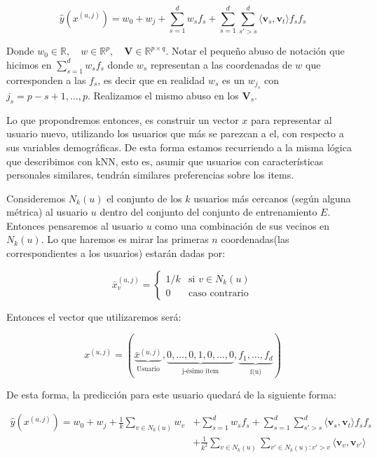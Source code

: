 \documentclass[hidelinks,12pt,a4paper]{book}
\providecommand{\prodint}[1]{\langle#1\rangle}
\theoremstyle{plain}
\theoremstyle{definition}
\begin{document}
\begin{equation}
\label{eq:prop0}
\hat{y}(x^{(u,j)}) = w_0+ w_j + \sum_{s = 1}^d w_s f_s + \sum_{s=1}^d \sum_{s'>s}^d \prodint{\mathbf{v}_s,\mathbf{v}_t} f_s f_{s}
\end{equation}

Donde  $w_0 \in \mathbb{R}, \quad w \in \mathbb{R}^p, \quad \textbf{V} \in \mathbb{R}^{p \times {q}}$. Notar el pequeño abuso de notación que hicimos en $\sum_{s = 1}^d w_s f_s$ donde $w_s$ representan a las coordenadas de $w$ que corresponden a las $f_s$, es decir que en realidad $w_s$ es un $w_{j_s}$ con $j_s = p-s+1, \ldots, p$. Realizamos el mismo abuso en los $\textbf{V}_s$.

Lo que propondremos entonces, es construir un vector $x$ para representar al usuario nuevo, utilizando los usuarios que más se parezcan a el, con respecto a sus variables demográficas. De esta forma estamos recurriendo a la misma lógica que describimos con kNN, esto es, asumir que usuarios con características personales similares, tendrán similares preferencias sobre los items. 

Consideremos $N_k(u)$ el conjunto de los $k$ usuarios más cercanos (según alguna métrica) al usuario $u$ dentro del conjunto del conjunto de entrenamiento $E$. Entonces pensaremos al usuario $u$ como una combinación de sus vecinos en $N_k(u)$. Lo que haremos es mirar las primeras $n$ coordenadas(las correspondientes a los usuarios) estarán dadas por:

\begin{equation}
\label{prop1}
\bar{x}_v^{(u,j)}=
\begin{cases}
1/k &\text{si } v\in N_k(u) \\
0 &\text{caso contrario}
\end{cases}
\end{equation}

Entonces el vector que utilizaremos será:

\begin{equation}
x^{(u,j)} = ( \underbrace{\bar{x}^{(u,j)}}_{\substack{\text{Usuario}}}, \underbrace{0,\ldots,0,1,0,\ldots,0}_{\substack{\text{j-ésimo ítem}}},  \underbrace{f_1,\ldots,f_d}_{\substack{\text{f(u)}}})
\end{equation}

De esta forma, la predicción para este usuario quedará de la siguiente forma:

\begin{equation}
\label{eq:prop1}
\begin{split}
\hat{y}(x^{(u,j)}) = w_0+ w_j + \frac{1}{k} \sum_{v\in N_k(u)} w_v & + \sum_{s = 1}^d w_s f_s + \sum_{s=1}^d \sum_{s'>s}^d \prodint{\mathbf{v}_s,\mathbf{v}_t} f_s f_{s} \\
& + \frac{1}{k^2}\sum_{v\in N_k(u)} \sum_{v'\in N_k(u): v'>v} \prodint{\mathbf{v}_v,\mathbf{v}_{v'}} 
\end{split}
\end{equation}
\end{document}
